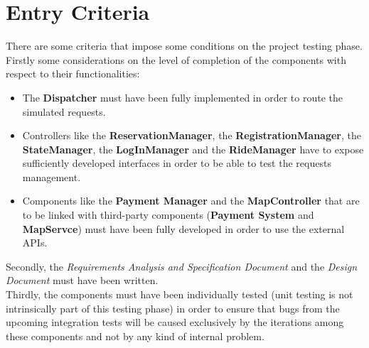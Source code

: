 \documentclass[11pt,a4paper]{report}
\begin{document}
\section{Entry Criteria}
There are some criteria that impose some conditions on the project testing phase.\\
Firstly some considerations on the level of completion of the components with respect to their functionalities:
\begin{itemize}
	\item The \textbf{Dispatcher} must have been fully implemented in order to route the simulated requests.
	\item Controllers like the \textbf{ReservationManager}, the \textbf{RegistrationManager}, the \textbf{StateManager}, the \textbf{LogInManager} and the \textbf{RideManager} have to expose sufficiently developed interfaces in order to be able to test the requests management.
	\item Components like the \textbf{Payment Manager} and the \textbf{MapController} that are to be linked with third-party components (\textbf{Payment System} and \textbf{MapServce}) must have been fully developed in order to use the external APIs.
\end{itemize}
Secondly, the \textit{Requirements Analysis and Specification Document} and the \textit{Design Document} must have been written.\\
Thirdly, the components must have been individually tested (unit testing is not intrinsically part of this testing phase) in order to ensure that bugs from the upcoming integration tests will be caused exclusively by the iterations among these components and not by any kind of internal problem.
\end{document}
